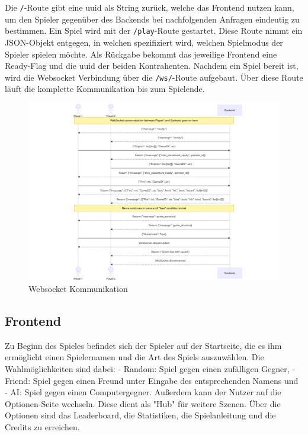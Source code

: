 \documentclass[a4paper, 10pt, conference]{IEEEtran}
\begin{document}
Die \texttt{/}-Route gibt eine \ac{uuid} als String zurück, welche das Frontend nutzen kann, um den Spieler gegenüber des Backends bei nachfolgenden Anfragen eindeutig zu bestimmen. Ein Spiel wird mit der \texttt{/play}-Route gestartet. Diese Route nimmt ein JSON-Objekt entgegen, in welchen spezifiziert wird, welchen Spielmodus der Spieler spielen möchte. Als Rückgabe bekommt das jeweilige Frontend eine Ready-Flag und die \ac{uuid} der beiden Kontrahenten. Nachdem ein Spiel bereit ist, wird die Websocket Verbindung über die \texttt{/ws/}-Route aufgebaut. Über diese Route läuft die komplette Kommunikation bis zum Spielende.

\begin{figure}[thp]
    \centering
    \includegraphics[width=\linewidth]{websocket_comm}
    \caption{Websocket Kommunikation}
    \label{fig:websocket_comm}
\end{figure}

\subsection{Frontend}\label{subsec:frontend}

Zu Beginn des Spieles befindet sich der Spieler auf der Startseite, die es ihm ermöglicht einen Spielernamen und die Art des Spiels auszuwählen. Die Wahlmöglichkeiten sind dabei: 
- Random: Spiel gegen einen zufälligen Gegner, 
- Friend: Spiel gegen einen Freund unter Eingabe des entsprechenden Namens und 
- AI: Spiel gegen einen Computergegner. 
Außerdem kann der Nutzer auf die Optionen-Seite wechseln. Diese dient als "Hub" für weitere Szenen. Über die Optionen sind das Leaderboard, die Statistiken, die Spielanleitung und die Credits zu erreichen. 
\end{document}
